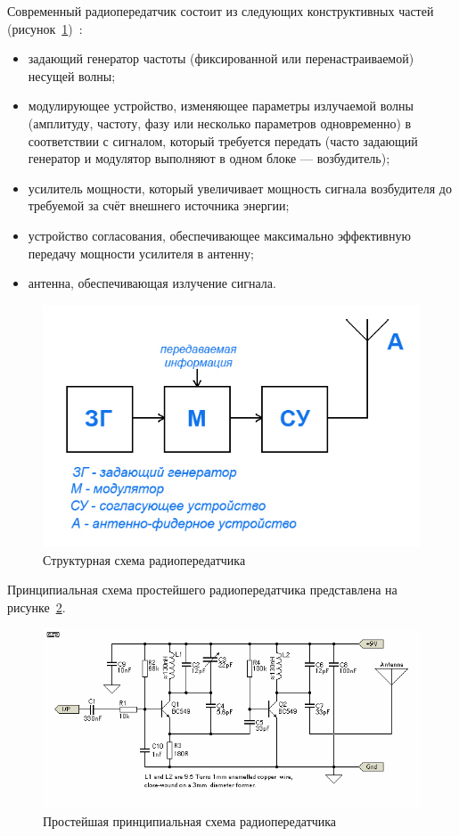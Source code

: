 Современный радиопередатчик состоит из следующих конструктивных частей (рисунок~\ref{fig:radiostruct})~\cite{wiki:radiotransmitter}:

\begin{itemize}
    \item задающий генератор частоты (фиксированной или перенастраиваемой) несущей волны;
    \item модулирующее устройство, изменяющее параметры излучаемой волны (амплитуду, частоту, фазу или несколько параметров одновременно) в соответствии с сигналом, который требуется передать (часто задающий генератор и модулятор выполняют в одном блоке — возбудитель);
    \item усилитель мощности, который увеличивает мощность сигнала возбудителя до требуемой за счёт внешнего источника энергии;
    \item устройство согласования, обеспечивающее максимально эффективную передачу мощности усилителя в антенну;
    \item антенна, обеспечивающая излучение сигнала.
\end{itemize}

\begin{figure}[ht]
    \includegraphics[width=.6\linewidth]{Figures/radiostruct.jpg}
    \caption{Структурная схема радиопередатчика}
    \label{fig:radiostruct}
\end{figure}

Принципиальная схема простейшего радиопередатчика представлена на рисунке~\ref{fig:rfcircuit}.

\begin{figure}[ht]
    \includegraphics[width=1\linewidth]{Figures/rfcircuit.png}
    \caption{Простейшая принципиальная схема радиопередатчика}
    \label{fig:rfcircuit}
\end{figure}

